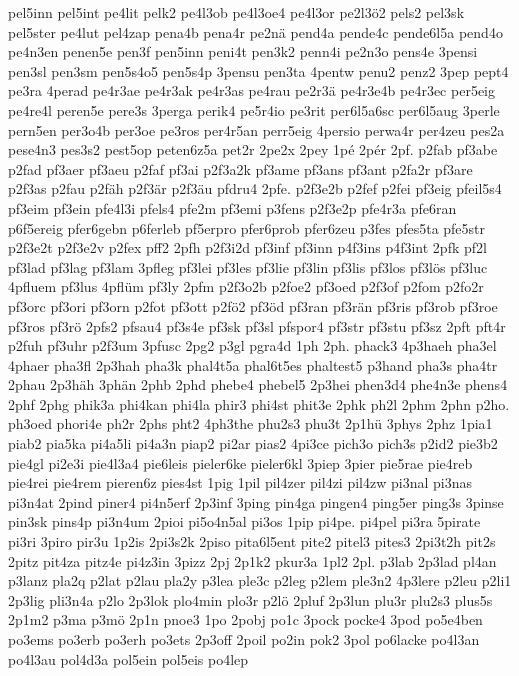 {pel5inn
pel5int
pe4lit
pelk2
pe4l3ob
pe4l3oe4
pe4l3or
pe2l3ö2
pels2
pel3sk
pel5ster
pe4lut
pel4zap
pena4b
pena4r
pe2nä
pend4a
pende4c
pende6l5a
pend4o
pe4n3en
penen5e
pen3f
pen5inn
peni4t
pen3k2
penn4i
pe2n3o
pens4e
3pensi
pen3sl
pen3sm
pen5s4o5
pen5s4p
3pensu
pen3ta
4pentw
penu2
penz2
3pep
pept4
pe3ra
4perad
pe4r3ae
pe4r3ak
pe4r3as
pe4rau
pe2r3ä
pe4r3e4b
pe4r3ec
per5eig
pe4re4l
peren5e
pere3s
3perga
perik4
pe5r4io
pe3rit
per6l5a6sc
per6l5aug
3perle
pern5en
per3o4b
per3oe
pe3ros
per4r5an
perr5eig
4persio
perwa4r
per4zeu
pes2a
pese4n3
pes3s2
pest5op
peten6z5a
pet2r
2pe2x
2pey
1pé
2pér
2pf.
p2fab
pf3abe
p2fad
pf3aer
pf3aeu
p2faf
pf3ai
p2f3a2k
pf3ame
pf3ans
pf3ant
p2fa2r
pf3are
p2f3as
p2fau
p2fäh
p2f3är
p2f3äu
pfdru4
2pfe.
p2f3e2b
p2fef
p2fei
pf3eig
pfeil5s4
pf3eim
pf3ein
pfe4l3i
pfels4
pfe2m
pf3emi
p3fens
p2f3e2p
pfe4r3a
pfe6ran
p6f5ereig
pfer6gebn
p6ferleb
pf5erpro
pfer6prob
pfer6zeu
p3fes
pfes5ta
pfe5str
p2f3e2t
p2f3e2v
p2fex
pff2
2pfh
p2f3i2d
pf3inf
pf3inn
p4f3ins
p4f3int
2pfk
pf2l
pf3lad
pf3lag
pf3lam
3pfleg
pf3lei
pf3les
pf3lie
pf3lin
pf3lis
pf3los
pf3lös
pf3luc
4pfluem
pf3lus
4pflüm
pf3ly
2pfm
p2f3o2b
p2foe2
pf3oed
p2f3of
p2fom
p2fo2r
pf3orc
pf3ori
pf3orn
p2fot
pf3ott
p2fö2
pf3öd
pf3ran
pf3rän
pf3ris
pf3rob
pf3roe
pf3ros
pf3rö
2pfs2
pfsau4
pf3s4e
pf3sk
pf3sl
pfspor4
pf3str
pf3stu
pf3sz
2pft
pft4r
p2fuh
pf3uhr
p2f3um
3pfusc
2pg2
p3gl
pgra4d
1ph
2ph.
phack3
4p3haeh
pha3el
4phaer
pha3fl
2p3hah
pha3k
phal4t5a
phal6t5es
phaltest5
p3hand
pha3s
pha4tr
2phau
2p3häh
3phän
2phb
2phd
phebe4
phebel5
2p3hei
phen3d4
phe4n3e
phens4
2phf
2phg
phik3a
phi4kan
phi4la
phir3
phi4st
phit3e
2phk
ph2l
2phm
2phn
p2ho.
ph3oed
phori4e
ph2r
2phs
pht2
4ph3the
phu2s3
phu3t
2p1hü
3phys
2phz
1pia1
piab2
pia5ka
pi4a5li
pi4a3n
piap2
pi2ar
pias2
4pi3ce
pich3o
pich3s
p2id2
pie3b2
pie4gl
pi2e3i
pie4l3a4
pie6leis
pieler6ke
pieler6kl
3piep
3pier
pie5rae
pie4reb
pie4rei
pie4rem
pieren6z
pies4st
1pig
1pil
pil4zer
pil4zi
pil4zw
pi3nal
pi3nas
pi3n4at
2pind
piner4
pi4n5erf
2p3inf
3ping
pin4ga
pingen4
ping5er
ping3s
3pinse
pin3sk
pins4p
pi3n4um
2pioi
pi5o4n5al
pi3os
1pip
pi4pe.
pi4pel
pi3ra
5pirate
pi3ri
3piro
pir3u
1p2is
2pi3s2k
2piso
pita6l5ent
pite2
pitel3
pites3
2pi3t2h
pit2s
2pitz
pit4za
pitz4e
pi4z3in
3pizz
2pj
2p1k2
pkur3a
1pl2
2pl.
p3lab
2p3lad
pl4an
p3lanz
pla2q
p2lat
p2lau
pla2y
p3lea
ple3c
p2leg
p2lem
ple3n2
4p3lere
p2leu
p2li1
2p3lig
pli3n4a
p2lo
2p3lok
plo4min
plo3r
p2lö
2pluf
2p3lun
plu3r
plu2s3
plus5s
2p1m2
p3ma
p3mö
2p1n
pnoe3
1po
2pobj
po1c
3pock
pocke4
3pod
po5e4ben
po3ems
po3erb
po3erh
po3ets
2p3off
2poil
po2in
pok2
3pol
po6lacke
po4l3an
po4l3au
pol4d3a
pol5ein
pol5eis
po4lep
}

